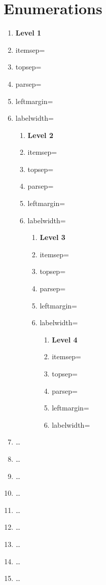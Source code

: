 \documentclass{sigchi-alternate}
\begin{document}
\newpage
\AddToShipoutPicture*{\ShowFramePicture}

\section{Enumerations}

\begin{enumerate}
  \item \textbf{Level 1}
  \item itemsep=\the\itemsep
  \item topsep=\the\topsep
  \item parsep=\the\parsep
  \item leftmargin=\the\leftmargin
  \item labelwidth=\the{}
  \begin{enumerate}
    \item \textbf{Level 2}
    \item itemsep=\the\itemsep
    \item topsep=\the\topsep
    \item parsep=\the\parsep
    \item leftmargin=\the\leftmargin
    \item labelwidth=\the{}
    \begin{enumerate}
      \item \textbf{Level 3}
      \item itemsep=\the\itemsep
      \item topsep=\the\topsep
      \item parsep=\the\parsep
      \item leftmargin=\the\leftmargin
      \item labelwidth=\the{}
      \begin{enumerate}
        \item \textbf{Level 4}
        \item itemsep=\the\itemsep
        \item topsep=\the\topsep
        \item parsep=\the\parsep
        \item leftmargin=\the\leftmargin
        \item labelwidth=\the{}
      \end{enumerate}
    \end{enumerate}
  \end{enumerate}
  \item \ldots
  \item \ldots
  \item \ldots
  \item \ldots
  \item \ldots
  \item \ldots
  \item \ldots
  \item \ldots
  \item \ldots
\end{enumerate}
\end{document}

